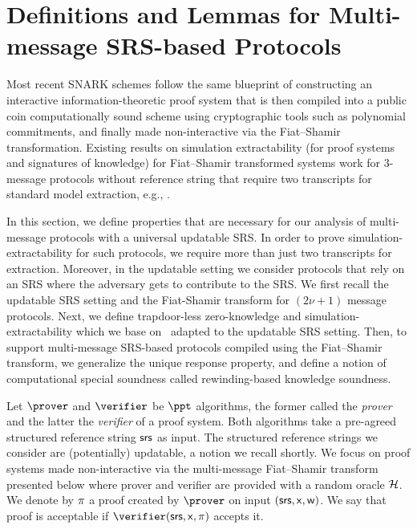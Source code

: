 \section{Definitions and Lemmas for Multi-message SRS-based Protocols}
\label{sec:se_definitions}
\label{sec:preliminaries}



Most recent SNARK schemes follow the same blueprint of constructing an interactive information-theoretic proof system 
that is then compiled into a public coin computationally sound scheme using cryptographic tools such as polynomial commitments,
and finally made non-interactive via the Fiat--Shamir transformation.
Existing results on simulation extractability (for proof systems and
signatures of knowledge) for Fiat--Shamir transformed systems work for $3$-message protocols without reference string that
require two transcripts for standard model extraction, e.g.,
\cite{JC:PoiSte00,INDOCRYPT:FKMV12,C:RotSeg21}.

In this section, we define properties that are necessary for our
analysis of multi-message protocols with a universal updatable SRS.  In order to
prove simulation-extractability for such protocols, we require more than just two
transcripts for extraction. Moreover, in the updatable setting we consider protocols
that rely on an SRS where the adversary gets to contribute to the SRS. We first recall the updatable SRS setting and the Fiat-Shamir transform for $(2\nu+1)$ message protocols.
Next, we define trapdoor-less zero-knowledge and simulation-extractability
which we base on~\cite{INDOCRYPT:FKMV12} adapted to the updatable SRS setting. Then,
to support multi-message SRS-based protocols compiled using the Fiat--Shamir transform,
we generalize the unique response property, and define a notion of computational special
soundness called rewinding-based knowledge soundness.\medskip


\noindent Let $\prover$ and $\verifier$ be $\ppt$ algorithms, the former called the \emph{prover}
and the latter the \emph{verifier} of a proof system. Both algorithms take a pre-agreed structured reference string $\mathsf{srs}$ as input. The structured reference strings we consider are (potentially) updatable, a notion we recall shortly.
%
We focus on proof systems made non-interactive via the multi-message Fiat--Shamir transform presented below where prover and
verifier are provided with a random oracle $\mathcal{H}$. 
We denote by $\pi$ a proof created by $\prover$ on input
$(\mathsf{srs}, \mathsf{x}, \mathsf{w})$. We say that proof is acceptable if $\verifier(\srs, \inp,
\zkproof)$ accepts it.

